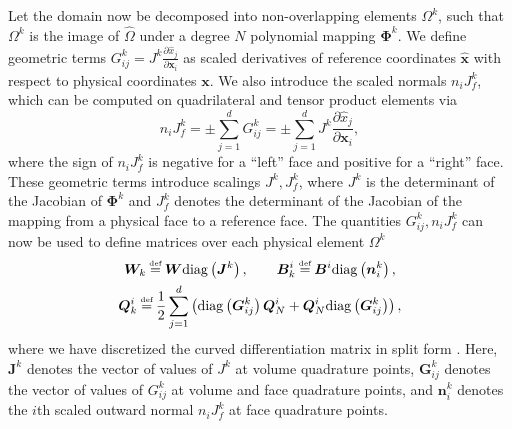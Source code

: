 \documentclass[review,onefignum,onetabnum,final]{siamart171218}
\renewcommand{\hat}{\widehat}
\newcommand{\pd}[2]{\frac{\partial#1}{\partial#2}}
\newcommand{\LRp}[1]{\left( #1 \right)}
\newcommand{\diag}[1]{{\rm diag}\LRp{#1}}
\newcommand\myeq{\mathrel{\stackrel{\makebox[0pt]{\mbox{\normalfont\tiny def}}}{=}}}
\begin{document}
Let the domain now be decomposed into non-overlapping elements $\Omega^k$, such that $\Omega^k$ is the image of $\hat{\Omega}$ under a degree $N$ polynomial mapping $\bm{\Phi}^k$.  We define geometric terms ${G}^k_{ij} = J^k\pd{\hat{x}_j}{\bm{x}_i}$ as scaled derivatives of reference coordinates $\hat{\bm{x}}$ with respect to physical coordinates $\bm{x}$.  We also introduce the scaled normals $n_iJ^k_f$, which can be computed on quadrilateral and tensor product elements via
\[
n_i J^k_f =\pm \sum_{j=1}^d G^k_{ij} = \pm \sum_{j=1}^d  J^k\pd{\hat{x}_j}{\bm{x}_i},
\]
where the sign of $n_i J^k_f$ is negative for a ``left'' face and positive for a ``right'' face.  
These geometric terms introduce scalings $J^k, J^k_f$, where $J^k$ is the determinant of the Jacobian of $\bm{\Phi}^k$ and $J^k_f$ denotes the determinant of the Jacobian of the mapping from a physical face to a reference face.  The quantities $G^k_{ij}, n_iJ^k_f$ can now be used to define matrices over each physical element $\Omega^k$ 
\begin{gather}
\bm{W}_k \myeq \bm{W} \diag{\bm{J}^k}, \qquad \bm{B}^i_k \myeq \bm{B}^i \diag{\bm{n}^k_i }, \nonumber\\
\bm{Q}^i_k \myeq \frac{1}{2} \sum_{j=1}^d \LRp{\diag{{\bm{G}}^k_{ij}}\bm{Q}^i_N  + \bm{Q}^i_N \diag{{\bm{G}}^k_{ij}} } \label{eq:splitcurv},
\end{gather}
where we have discretized the curved differentiation matrix in split form \cite{nordstrom2006conservative, kopriva2016geometry}.  
Here, $\bm{J}^k$ denotes the vector of values of $J^k$ at volume quadrature points, ${\bm{G}}^k_{ij}$ denotes the vector of values of ${G}^k_{ij}$ at volume and face quadrature points, and $\bm{n}^k_i$ denotes the $i$th scaled outward normal $n_i J^k_f$ at face quadrature points.  
\end{document}
